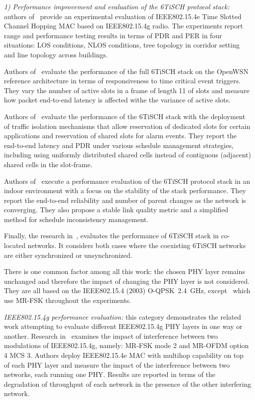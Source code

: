 \documentclass[journal]{IEEEtran}
\newcommand{\oqpsk}        {O-QPSK~2.4~GHz}
\begin{document}

\textit{1) Performance improvement and evaluation of the 6TiSCH protocol stack:} authors of~\cite{sum17experimental} provide an experimental evaluation of IEEE802.15.4e Time Slotted Channel Hopping MAC based on IEEE802.15.4g radio.
The experiments report range and performance testing results in terms of PDR and PER in four situations: LOS conditions, NLOS conditions, tree topology in corridor setting and line topology across buildings.

Authors of~\cite{yang18analysis} evaluate the performance of the full 6TiSCH stack on the OpenWSN reference architecture in terms of responsiveness to time critical event triggers.
They vary the number of active slots in a frame of length 11 of slots and measure how packet end-to-end latency is affected withe the variance of active slots. 

Authors of~\cite{theoleyre16experimental} evaluate the performance of the 6TiSCH stack with the deployment of traffic isolation mechanisms that allow reservation of dedicated slots for certain applications and reservation of shared slots for alarm events.
They report the end-to-end latency and PDR under various schedule management strategies, including using uniformly distributed shared cells instead of contiguous (adjacent) shared cells in the slot-frame.

Authors of~\cite{teleshermeto18reactions} execute a performance evaluation of the 6TiSCH protocol stack in an indoor environment with a focus on the stability of the stack performance.
They report the end-to-end reliability and number of parent changes as the network is converging.
They also propose a stable link quality metric and a simplified method for schedule inconsistency management. 

Finally, the research in~\cite{benyaala16performance}, evaluates the performance of 6TiSCH stack in co-located networks.
It considers both cases where the coexisting 6TiSCH networks are either  synchronized or unsynchronized.

There is one common factor among all this work: the chosen PHY layer remains unchanged and therefore the impact of changing the PHY layer is not considered. 
They are all based on the IEEE802.15.4 (2003) \oqpsk , except~\cite{sum17experimental} which use MR-FSK throughout the experiments. 


\textit{IEEE802.15.4g performance evaluation:} this category  demonstrates the related  work attempting to evaluate different IEEE802.15.4g PHY layers in one way or another.
Research in~\cite{kojima15system} examines the impact of interference between two modulations of IEEE802.15.4g, namely: MR-FSK mode 2 and MR-OFDM option 4 MCS 3. 
Authors deploy IEEE802.15.4e MAC with multihop capability on top of each PHY layer and measure the impact of the interference between two networks, each running one PHY.
Results are reported in terms of the degradation of throughput of each network in the presence of the other interfering network.
\end{document}
